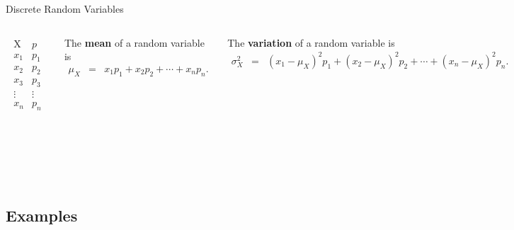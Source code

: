 \begin{frame}{Discrete Random Variables}

  \begin{columns}
    \begin{eqnarray*}
      \begin{array}{l|l}
        \mathrm{X} & p \\ \hline
        x_1 & p_1 \\
        x_2 & p_2 \\
        x_3 & p_3 \\
        \vdots & \vdots \\
        x_n & p_n
      \end{array}
    \end{eqnarray*}
    \vfill

    {
      \begin{definition}
        The \textbf{mean} of a random variable is
        \begin{eqnarray*}
          \mu_X & = & x_1 p_1 + x_2 p_2 + \cdots + x_n p_n.
        \end{eqnarray*}
      \end{definition}
    }

    {
      \begin{definition}
        The \textbf{variation} of a random variable is
        \begin{eqnarray*}
          \sigma^2_X & = & (x_1-\mu_X)^2 p_1 + (x_2-\mu_X)^2 p_2 + \cdots + (x_n-\mu_X)^2 p_n.
        \end{eqnarray*}
      \end{definition}
    }

    {
      \begin{definition}
        The \textbf{standard deviation} of a random variable is the
        square root of the variance.
      \end{definition}
    }

    
  \end{columns}
  
\end{frame}


\subsection{Examples}

